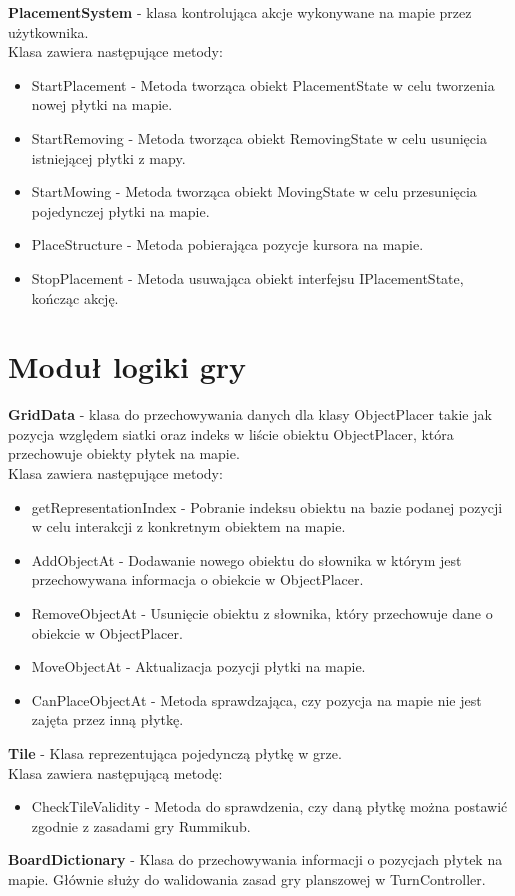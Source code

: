 \documentclass[a4paper,twoside,12pt]{book}
\begin{document}
	
	
	\textbf{PlacementSystem} - klasa kontrolująca akcje wykonywane na mapie przez użytkownika.\\ Klasa zawiera następujące metody:
			\begin{itemize}
				\item StartPlacement - Metoda tworząca obiekt PlacementState w celu tworzenia nowej płytki na mapie.
				\item StartRemoving - Metoda tworząca obiekt RemovingState w celu usunięcia istniejącej płytki z mapy.
				\item StartMowing - Metoda tworząca obiekt MovingState w celu przesunięcia pojedynczej płytki na mapie.
				\item PlaceStructure - Metoda pobierająca  pozycje kursora na mapie.
				\item StopPlacement - Metoda usuwająca obiekt interfejsu IPlacementState, kończąc akcję.
			\end{itemize}
	
	\section{Moduł logiki gry}
	 \textbf{GridData} - klasa do przechowywania danych dla klasy ObjectPlacer takie jak pozycja względem siatki oraz indeks w liście obiektu ObjectPlacer, która przechowuje obiekty płytek na mapie. \\Klasa zawiera następujące metody:
			\begin{itemize}
				\item getRepresentationIndex - Pobranie indeksu obiektu na bazie podanej pozycji w celu interakcji z konkretnym obiektem na mapie.
				\item AddObjectAt - Dodawanie nowego obiektu do słownika w którym jest przechowywana informacja o obiekcie w ObjectPlacer.
				\item RemoveObjectAt - Usunięcie obiektu z słownika, który przechowuje dane o obiekcie w ObjectPlacer.
				\item MoveObjectAt - Aktualizacja pozycji płytki na mapie.
				\item CanPlaceObjectAt - Metoda sprawdzająca, czy pozycja na mapie nie jest zajęta przez inną płytkę. 
			\end{itemize}
	
	
	\textbf{Tile} - Klasa reprezentująca pojedynczą płytkę w grze.\\ Klasa zawiera następującą metodę:
			\begin{itemize}
				\item CheckTileValidity - Metoda do sprawdzenia, czy daną płytkę można postawić zgodnie z zasadami gry Rummikub.
			\end{itemize}
	\textbf{BoardDictionary} - Klasa do przechowywania informacji o pozycjach płytek na mapie. Głównie służy do walidowania zasad gry planszowej w TurnController.
	
\end{document}
